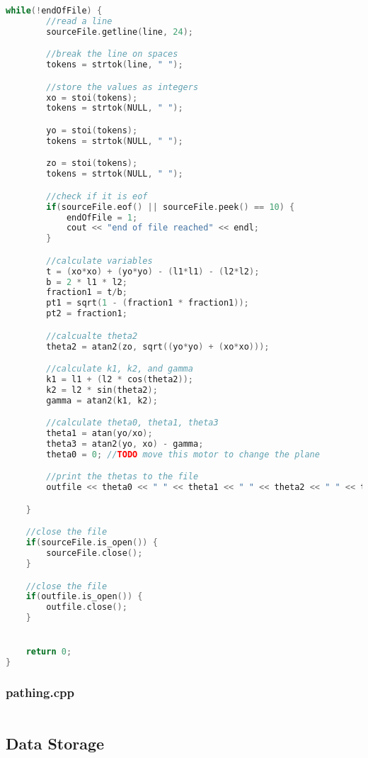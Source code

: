 \begin{lstlisting}[language=C++]
	while(!endOfFile) {
		//read a line
		sourceFile.getline(line, 24);

		//break the line on spaces
		tokens = strtok(line, " ");

		//store the values as integers
		xo = stoi(tokens);
		tokens = strtok(NULL, " ");

		yo = stoi(tokens);
		tokens = strtok(NULL, " ");

		zo = stoi(tokens);
		tokens = strtok(NULL, " ");

		//check if it is eof
		if(sourceFile.eof() || sourceFile.peek() == 10) {
			endOfFile = 1;
			cout << "end of file reached" << endl;
		}

		//calculate variables
		t = (xo*xo) + (yo*yo) - (l1*l1) - (l2*l2);
		b = 2 * l1 * l2;
		fraction1 = t/b;
		pt1 = sqrt(1 - (fraction1 * fraction1));
		pt2 = fraction1;

		//calcualte theta2
		theta2 = atan2(zo, sqrt((yo*yo) + (xo*xo)));

		//calculate k1, k2, and gamma
		k1 = l1 + (l2 * cos(theta2));
		k2 = l2 * sin(theta2);
		gamma = atan2(k1, k2);

		//calculate theta0, theta1, theta3
		theta1 = atan(yo/xo);
		theta3 = atan2(yo, xo) - gamma;
		theta0 = 0; //TODO move this motor to change the plane

		//print the thetas to the file
		outfile << theta0 << " " << theta1 << " " << theta2 << " " << theta3 << " " << endl;

	}

	//close the file
	if(sourceFile.is_open()) {
		sourceFile.close();
	}

	//close the file
	if(outfile.is_open()) {
		outfile.close();
	}


	return 0;
}
\end{lstlisting}
\subsubsection{pathing.cpp}
\begin{lstlisting}[language=C++]
\end{lstlisting}
\subsection{Data Storage}
